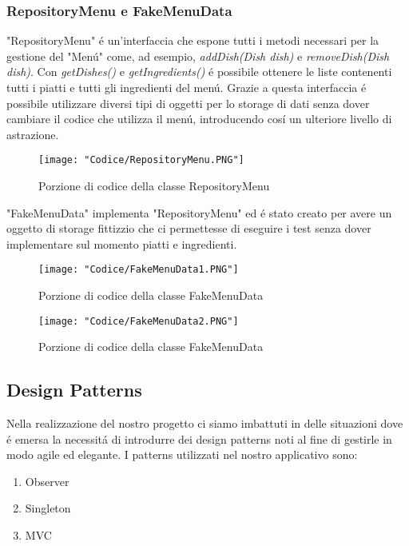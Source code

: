 \documentclass{article}
\begin{document}
\subsubsection{RepositoryMenu e FakeMenuData}

"RepositoryMenu" \'e un'interfaccia che espone tutti i metodi necessari per la gestione del "Men\'u" come, ad esempio, \textit{addDish(Dish dish)} e \textit{removeDish(Dish dish)}. Con \textit{getDishes()} e \textit{getIngredients()} \'e possibile ottenere le liste contenenti tutti i piatti e tutti gli ingredienti del men\'u. Grazie a questa interfaccia \'e possibile utilizzare diversi tipi di oggetti per lo storage di dati senza dover cambiare il codice che utilizza il men\'u, introducendo cos\'i un ulteriore livello di astrazione.


\begin{figure}[!h]
\centering
\texttt{[image: "Codice/RepositoryMenu.PNG"]}
\caption{Porzione di codice della classe RepositoryMenu}
\end{figure}

\newpage

\noindent "FakeMenuData" implementa "RepositoryMenu" ed \'e stato creato per avere un oggetto di storage fittizzio che ci permettesse di eseguire i test senza dover implementare sul momento piatti e ingredienti.

\begin{figure}[!h]
\centering
\texttt{[image: "Codice/FakeMenuData1.PNG"]}
\caption{Porzione di codice della classe FakeMenuData}
\end{figure}

\begin{figure}[!h]
\centering
\texttt{[image: "Codice/FakeMenuData2.PNG"]}
\caption{Porzione di codice della classe FakeMenuData}
\end{figure}

\newpage

\subsection{Design Patterns}
Nella realizzazione del nostro progetto ci siamo imbattuti in delle situazioni dove \'e emersa la necessit\'a di introdurre dei design patterns noti al fine di gestirle in modo agile ed elegante. I patterns utilizzati nel nostro applicativo sono: 

\begin{enumerate}
\item Observer
\item Singleton
\item MVC
\end{enumerate}
\end{document}
